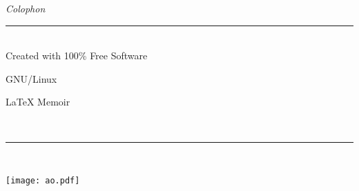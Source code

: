 %
%
%
%
%

\begin{vplace}
\centering
\emph{\LARGE Colophon}

\rule{0.5\textwidth}{0.4pt}\\[\baselineskip]

{\tiny Created with 100\% Free Software}

GNU/Linux

{\LaTeX} Memoir

\rule{0\textwidth}{0pt}\\[\baselineskip]%
\rule{0.5\textwidth}{0.4pt}\\[\baselineskip]
\end{vplace}

\centering
\texttt{[image: ao.pdf]}



